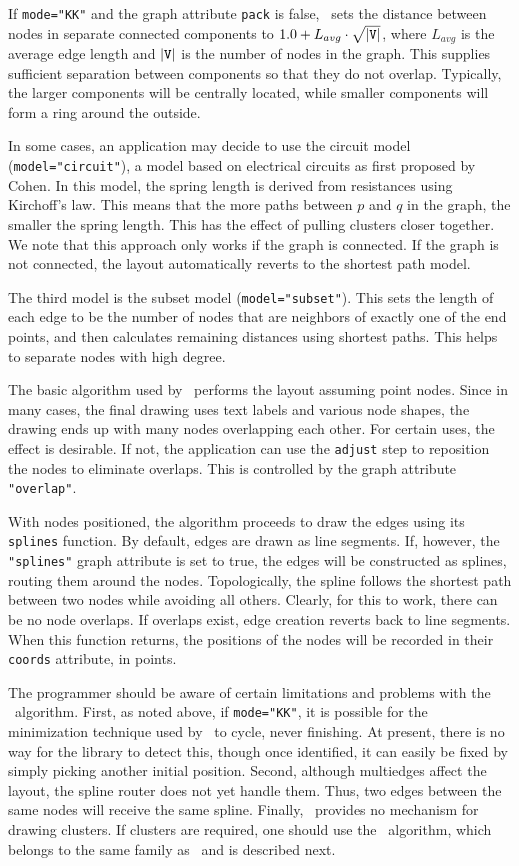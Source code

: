If {\tt mode="KK"} and the graph attribute {\tt pack} is false, 
\neato\ sets the distance between nodes in separate connected components
to $1.0 + L_{avg}\cdot\sqrt{|{\tt V}|}$, 
where $L_{avg}$ is the average edge length and $|{\tt V}|$
is the number of nodes in the graph.
This supplies sufficient separation between components
so that they do not overlap. Typically, the larger components will be
centrally located, while smaller components will form a ring around
the outside.

In some cases, an application may decide to use the circuit model
({\tt model="circuit"}),
a model based on electrical circuits 
as first proposed by Cohen\cite{cohen}. 
In this model, the spring length is derived from resistances using
Kirchoff's law. This means that the more paths between  $p$ and $q$
in the graph, the smaller the spring length. This has the effect of
pulling clusters closer together.
We note that this approach only works if the graph is connected.
If the graph is not connected, the layout automatically reverts to the
shortest path model.

The third model is the subset model ({\tt model="subset"}).
This sets the length of each edge to be the number of nodes that are 
neighbors of exactly one of the end points, and then calculates 
remaining distances using shortest paths. This helps to separate 
nodes with high degree. 

The basic algorithm used by \neato\ performs the layout assuming
point nodes. Since in many cases, the final drawing uses text
labels and various node shapes, the drawing ends up with many
nodes overlapping each other. For certain uses, the effect is
desirable. If not, the application can use the {\tt adjust} step to
reposition the nodes to eliminate overlaps. This is controlled by the
graph attribute {\tt "overlap"}.

With nodes positioned, the algorithm proceeds to draw the
edges using its {\tt splines} function. 
By default, edges are drawn as line
segments. If, however, the {\tt "splines"} graph attribute is
set to true, the edges will be constructed as
splines\cite{paths}, 
routing them around the nodes. Topologically, the spline
follows the shortest path between two nodes while avoiding all others.
Clearly, for this to work, there can be no node overlaps. If overlaps
exist, edge creation reverts back to line segments.
When this function returns, the positions of the nodes will be recorded
in their {\tt coords} attribute, in points.

The programmer should be aware of certain limitations and
problems with the \neato\ algorithm. 
First, as noted above, if {\tt mode="KK"}, 
it is possible for the minimization technique used by \neato\
to cycle, never finishing. At present, there
is no way for the library to detect this, though once identified,
it can easily be fixed by simply picking another initial position.
Second, although multiedges affect the layout,
the spline router does not yet handle them. Thus,
two edges between the same nodes will receive the same spline.
Finally, \neato\ provides no mechanism for drawing clusters. 
If clusters are required, one should use the \fdp\ algorithm, which belongs
to the same family as \neato\ and is described next.

